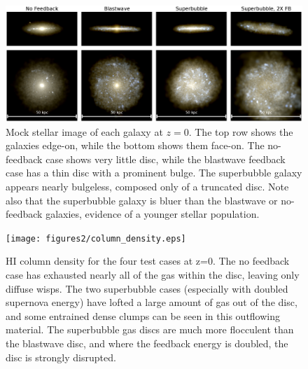 \begin{figure}
    
    \includegraphics[width=\textwidth]{figures2/stellar_image.eps}
    \caption[Mock stellar image of galaxy at z=0 with different feedback
    models]{Mock stellar image of each galaxy at $z=0$.  The top row shows the
    galaxies edge-on, while the bottom shows them face-on.  The no-feedback case
    shows very little disc, while the blastwave feedback case has a thin disc
    with a prominent bulge.  The superbubble galaxy appears nearly bulgeless,
    composed only of a truncated disc. Note also that the superbubble galaxy is
    bluer than the blastwave or no-feedback galaxies, evidence of a younger
    stellar population.}
    \label{stellar_image2}
\end{figure}
\begin{figure}
    \texttt{[image: figures2/column\_density.eps]}
    \caption[HI column density in a galaxy at z=0 with different feedback models]{HI
    column density for the four test cases at z=0.  The no feedback case has
    exhausted nearly all of the gas within the disc, leaving only diffuse wisps.
    The two superbubble cases (especially with doubled supernova energy) have
    lofted a large amount of gas out of the disc, and some entrained dense
    clumps can be seen in this outflowing material.  The superbubble gas discs
    are much more flocculent than the blastwave disc, and where the feedback
    energy is doubled, the disc is strongly disrupted.}
    \label{column_density2}
\end{figure}
